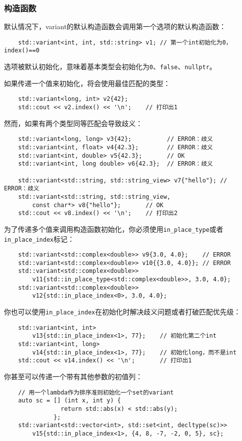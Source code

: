 \subsubsection*{构造函数}
默认情况下，variant的默认构造函数会调用第一个选项的默认构造函数：
\begin{lstlisting}
    std::variant<int, int, std::string> v1; // 第一个int初始化为0，index()==0
\end{lstlisting}
选项被默认初始化，意味着基本类型会初始化为\texttt{0}、\texttt{false}、\texttt{nullptr}。

如果传递一个值来初始化，将会使用最佳匹配的类型：
\begin{lstlisting}
    std::variant<long, int> v2{42};
    std::cout << v2.index() << '\n';    // 打印出1
\end{lstlisting}
然而，如果有两个类型同等匹配会导致歧义：
\begin{lstlisting}
    std::variant<long, long> v3{42};          // ERROR：歧义
    std::variant<int, float> v4{42.3};        // ERROR：歧义
    std::variant<int, double> v5{42.3};       // OK
    std::variant<int, long double> v6{42.3};  // ERROR：歧义

    std::variant<std::string, std::string_view> v7{"hello"}; // ERROR：歧义
    std::variant<std::string, std::string_view,
        const char*> v8{"hello"};       // OK
    std::cout << v8.index() << '\n';    // 打印出2
\end{lstlisting}
为了传递多个值来调用构造函数初始化，你必须使用\texttt{in\_place\_type}或者
\texttt{in\_place\_index}标记：
\begin{lstlisting}
    std::variant<std::complex<double>> v9{3.0, 4.0};    // ERROR
    std::variant<std::complex<double>> v10{{3.0, 4.0}}; // ERROR
    std::variant<std::complex<double>>
        v11{std::in_place_type<std::complex<double>>, 3.0, 4.0};
    std::variant<std::complex<double>>
        v12{std::in_place_index<0>, 3.0, 4.0};
\end{lstlisting}
你也可以使用\texttt{in\_place\_index}在初始化时解决歧义问题或者打破匹配优先级：
\begin{lstlisting}
    std::variant<int, int>
        v13{std::in_place_index<1>, 77};    // 初始化第二个int
    std::variant<int, long>
        v14{std::in_place_index<1>, 77};    // 初始化long，而不是int
    std::cout << v14.index() << '\n';       // 打印出1
\end{lstlisting}
你甚至可以传递一个带有其他参数的初值列：
\begin{lstlisting}
    // 用一个lambda作为排序准则初始化一个set的variant
    auto sc = [] (int x, int y) {
                return std::abs(x) < std::abs(y);
              };
    std::variant<std::vector<int>, std::set<int, decltype(sc)>>
        v15{std::in_place_index<1>, {4, 8, -7, -2, 0, 5}, sc};
\end{lstlisting}
